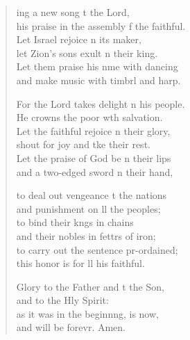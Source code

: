 \settowidth{\versewidth}{his praise in the assembly of the faithful.}
\begin{verse}%
  \begin{patverse}
    ing a new song t the Lord,\Med\\
his praise in the assembly f the faithful.\\
Let Israel rejoice \pointup{\i}n its maker,\Med\\
let Zion’s sons exult \pointup{\i}n their king.\\
Let them praise his nme with dancing\Med\\
and make music with timbrl and harp.

For the Lord takes delight \pointup{\i}n his people.\Med\\
He crowns the poor w\pointup{\i}th salvation.\\
Let the faithful rejoice \pointup{\i}n their glory,\Med\\
shout for joy and tke their rest.\\
Let the praise of God be n their lips\Med\\
and a two-edged sword \pointup{\i}n their hand,

to deal out vengeance t the nations\Med\\
and punishment on ll the peoples;\\
to bind their k\pointup{\i}ngs in chains\Med\\
and their nobles in fettrs of iron;\\
to carry out the sentence pr-ordained;\Med\\
this honor is for ll his faithful.

Glory to the Father and t the Son,\Med\\
and to the Hly Spirit:\\
as it was in the beginn\pointup{\i}ng, is now,\Med\\
and will be forevr. Amen.
  \end{patverse}
\end{verse}
